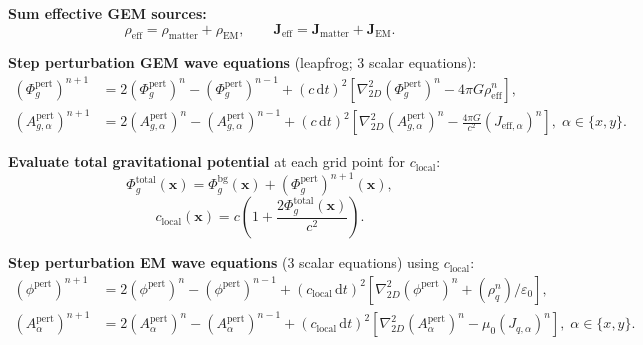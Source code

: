 \documentclass[11pt,a4paper]{article}
\newcommand{\vv}[1]{\mathbf{#1}}
\newcommand{\Phig}{\Phi_g}
\newcommand{\dd}{\mathrm{d}}
\begin{document}
\begin{algsteps}
  \item \textbf{Sum effective GEM sources:}
  \begin{equation}
    \rho_{\mathrm{eff}} = \rho_{\mathrm{matter}} + \rho_{\mathrm{EM}}, \qquad
    \vv{J}_{\mathrm{eff}} = \vv{J}_{\mathrm{matter}} + \vv{J}_{\mathrm{EM}}.
  \end{equation}

  \item \textbf{Step perturbation GEM wave equations} (leapfrog; 3 scalar equations):
  \begin{align}
    (\Phig^{\mathrm{pert}})^{n+1} &= 2(\Phig^{\mathrm{pert}})^n - (\Phig^{\mathrm{pert}})^{n-1}
       + (c\,\dd t)^2\!\left[\nabla_{2D}^2(\Phig^{\mathrm{pert}})^n - 4\pi G\rho_{\mathrm{eff}}^n\right], \\
    (A_{g,\alpha}^{\mathrm{pert}})^{n+1} &= 2(A_{g,\alpha}^{\mathrm{pert}})^n - (A_{g,\alpha}^{\mathrm{pert}})^{n-1}
       + (c\,\dd t)^2\!\left[\nabla_{2D}^2(A_{g,\alpha}^{\mathrm{pert}})^n
       - \frac{4\pi G}{c^2}(J_{\mathrm{eff},\alpha})^n\right], \;\alpha\in\{x,y\}.
  \end{align}

  \item \textbf{Evaluate total gravitational potential} at each grid point for $c_{\mathrm{local}}$:
  \begin{equation}
    \Phig^{\mathrm{total}}(\vv{x}) = \Phig^{\mathrm{bg}}(\vv{x}) + (\Phig^{\mathrm{pert}})^{n+1}(\vv{x}),
  \end{equation}
  \begin{equation}
    c_{\mathrm{local}}(\vv{x}) = c\!\left(1 + \frac{2\Phig^{\mathrm{total}}(\vv{x})}{c^2}\right).
  \end{equation}

  \item \textbf{Step perturbation EM wave equations} (3 scalar equations) using $c_{\mathrm{local}}$:
  \begin{align}
    (\phi^{\mathrm{pert}})^{n+1} &= 2(\phi^{\mathrm{pert}})^n - (\phi^{\mathrm{pert}})^{n-1}
       + (c_{\mathrm{local}}\,\dd t)^2\!\left[\nabla_{2D}^2(\phi^{\mathrm{pert}})^n + (\rho_q^n)/\varepsilon_0\right], \\
    (A_\alpha^{\mathrm{pert}})^{n+1} &= 2(A_\alpha^{\mathrm{pert}})^n - (A_\alpha^{\mathrm{pert}})^{n-1}
       + (c_{\mathrm{local}}\,\dd t)^2\!\left[\nabla_{2D}^2(A_\alpha^{\mathrm{pert}})^n
       - \mu_0 (J_{q,\alpha})^n\right], \;\alpha\in\{x,y\}.
  \end{align}


\end{algsteps}
\end{document}
